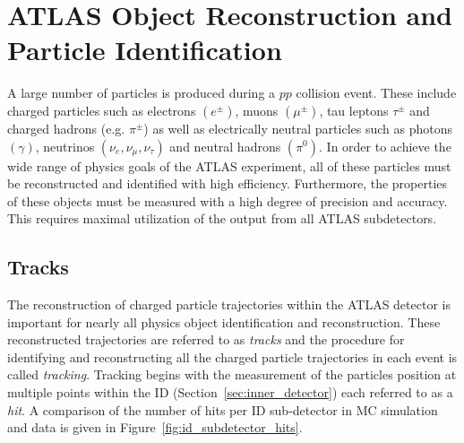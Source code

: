 \graphicspath{{Ch3_Reconstruction/figures/}}

\chapter{ATLAS Object Reconstruction and Particle Identification}
\label{ch:reconstruction}

A large number of particles is produced during a $pp$ collision event.
These include charged particles such as electrons $(e^\pm)$, muons $(\mu^\pm)$, tau leptons $\tau^\pm$ and charged hadrons (e.g. $\pi^\pm$) as well as electrically neutral particles such as photons $(\gamma)$, neutrinos $(\nu_e, \nu_\mu, \nu_\tau)$ and neutral hadrons $(\pi^0)$.
In order to achieve the wide range of physics goals of the ATLAS experiment, all of these particles must be reconstructed and identified with high efficiency.
Furthermore, the properties of these objects must be measured with a high degree of precision and accuracy.
This requires maximal utilization of the output from all ATLAS subdetectors.

\section{Tracks}
\label{sec:tracking}
The reconstruction of charged particle trajectories within the ATLAS detector is important for nearly all physics object identification and reconstruction.
These reconstructed trajectories are referred to as \textit{tracks} and the procedure for identifying and reconstructing all the charged particle trajectories in each event is called \textit{tracking}.
Tracking begins with the measurement of the particles position at multiple points within the ID (Section~\ref{sec:inner_detector}) each referred to as a \textit{hit}.
A comparison of the number of hits per ID sub-detector in MC simulation and data is given in Figure~\ref{fig:id_subdetector_hits}.

